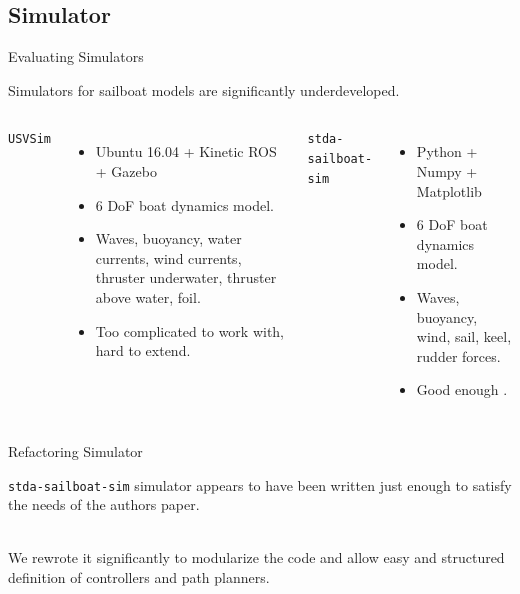 \documentclass[10pt,xcolor={table,dvipsnames},t]{beamer}
\begin{document}
\subsection{Simulator}
\begin{frame}{Evaluating Simulators}
    
    
    Simulators for sailboat models are significantly underdeveloped.
    
    \begin{columns}
        \centerline{\texttt{USVSim} \cite{Paravisi2019}}
        \begin{itemize}
            \item Ubuntu 16.04 + Kinetic ROS + Gazebo
            \item 6 DoF boat dynamics model.
            \item Waves, buoyancy, water currents, wind currents, thruster underwater, thruster above water, foil.
            \item Too complicated to work with, hard to extend.
        \end{itemize}
        \centerline{\texttt{stda-sailboat-sim} \cite{Buehler2018}}
        \begin{itemize}
            \item Python + Numpy + Matplotlib
            \item 6 DoF boat dynamics model.
            \item Waves, buoyancy, wind, sail, keel, rudder forces.
            \item Good enough .
        \end{itemize}

    \end{columns}
    
\end{frame}



\begin{frame}{Refactoring Simulator}

    \texttt{stda-sailboat-sim} simulator appears to have been written just enough to satisfy the needs of the authors paper.
    
    \hfill\\
    We rewrote it significantly to modularize the code and allow easy and structured definition
    of controllers and path planners.

\end{frame}
\end{document}
